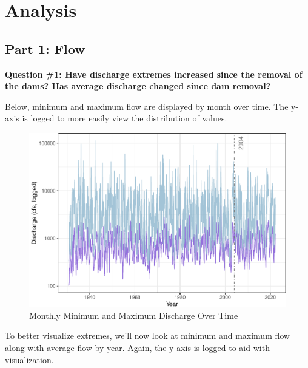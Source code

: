 \documentclass[
  12pt,
]{article}
\begin{document}
\newpage

\hypertarget{analysis}{%
\section{Analysis}\label{analysis}}

\hypertarget{part-1-flow}{%
\subsection{Part 1: Flow}\label{part-1-flow}}

\textbf{Question \#1: Have discharge extremes increased since the
removal of the dams? Has average discharge changed since dam removal?}

Below, minimum and maximum flow are displayed by month over time. The
y-axis is logged to more easily view the distribution of values.

\begin{figure}
\centering
\includegraphics{Project_Script_files/figure-latex/Flow.analysis-1.pdf}
\caption{Monthly Minimum and Maximum Discharge Over Time}
\end{figure}

To better visualize extremes, we'll now look at minimum and maximum flow
along with average flow by year. Again, the y-axis is logged to aid with
visualization.
\end{document}
